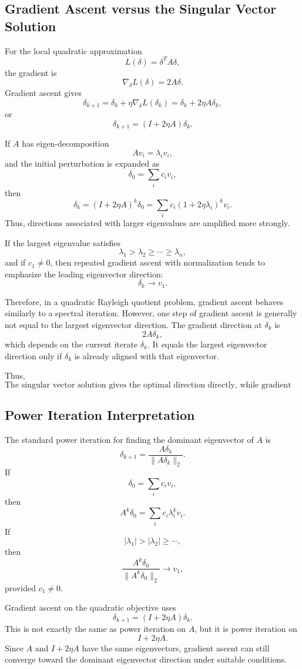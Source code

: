 \documentclass{article}
\begin{document}
\subsection{Gradient Ascent versus the Singular Vector Solution}

For the local quadratic approximation
\[
L(\delta)=\delta^T A\delta,
\]
the gradient is
\[
\nabla_\delta L(\delta)=2A\delta.
\]
Gradient ascent gives
\[
\delta_{k+1}
=
\delta_k+\eta \nabla_\delta L(\delta_k)
=
\delta_k+2\eta A\delta_k,
\]
or
\[
\delta_{k+1}
=
(I+2\eta A)\delta_k.
\]

If \(A\) has eigen-decomposition
\[
Av_i=\lambda_i v_i,
\]
and the initial perturbation is expanded as
\[
\delta_0=\sum_i c_i v_i,
\]
then
\[
\delta_k
=
(I+2\eta A)^k\delta_0
=
\sum_i c_i(1+2\eta\lambda_i)^k v_i.
\]
Thus, directions associated with larger eigenvalues are amplified more strongly.

If the largest eigenvalue satisfies
\[
\lambda_1>\lambda_2\geq \cdots \geq \lambda_n,
\]
and if \(c_1\neq 0\), then repeated gradient ascent with normalization tends to emphasize the leading eigenvector direction:
\[
\delta_k \to v_1.
\]

Therefore, in a quadratic Rayleigh quotient problem, gradient ascent behaves similarly to a spectral iteration. However, one step of gradient ascent is generally not equal to the largest eigenvector direction. The gradient direction at \(\delta_k\) is
\[
2A\delta_k,
\]
which depends on the current iterate \(\delta_k\). It equals the largest eigenvector direction only if \(\delta_k\) is already aligned with that eigenvector.

Thus,
\[
\boxed{
\text{The singular vector solution gives the optimal direction directly, while gradient ascent approaches it iteratively.}
}
\]

\subsection{Power Iteration Interpretation}

The standard power iteration for finding the dominant eigenvector of \(A\) is
\[
\delta_{k+1}
=
\frac{A\delta_k}{\|A\delta_k\|_2}.
\]
If
\[
\delta_0=\sum_i c_i v_i,
\]
then
\[
A^k\delta_0
=
\sum_i c_i \lambda_i^k v_i.
\]
If
\[
|\lambda_1|>|\lambda_2|\geq \cdots,
\]
then
\[
\frac{A^k\delta_0}{\|A^k\delta_0\|_2}
\to
v_1,
\]
provided \(c_1\neq 0\).

Gradient ascent on the quadratic objective uses
\[
\delta_{k+1}
=
(I+2\eta A)\delta_k.
\]
This is not exactly the same as power iteration on \(A\), but it is power iteration on
\[
I+2\eta A.
\]
Since \(A\) and \(I+2\eta A\) have the same eigenvectors, gradient ascent can still converge toward the dominant eigenvector direction under suitable conditions.
\end{document}
